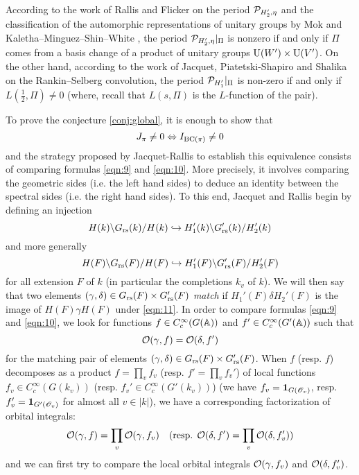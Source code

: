 According to the work of Rallis and Flicker \cite{flicker1988twisted} on the period $\mathcal{P}_{H_2', \eta}$ and the classification of the 
automorphic representations of unitary groups by Mok \cite{mok2015endoscopic} and Kaletha--Minguez--Shin--White \cite{kaletha2014endoscopic}, the period $\mathcal{P}_{H_2', \eta}|_\Pi$ is nonzero if and only if $\Pi$ comes from a basis change of a product of unitary groups $\mathrm{U}(W') \times \mathrm{U}(V')$.
On the other hand, according to the work of
Jacquet, Piatetski-Shapiro and Shalika \cite{jacquet1983rankin} on the Rankin--Selberg convolution, the period $\mathcal{P}_{H_1'}|_\Pi$ is non-zero if and only if $L(\frac{1}{2}, \Pi) \neq 0$ (where, recall that $L(s, \Pi)$ is the $L$-function of the pair).

To prove the conjecture \ref{conj:global}, it is enough to show that
\[
    J_\pi \neq 0 \Leftrightarrow I_{\mathrm{BC}(\pi)} \neq 0
\]
and the strategy proposed by Jacquet-Rallis to establish this equivalence consists of comparing formulas \eqref{eqn:9} and \eqref{eqn:10}.
More precisely, it involves comparing the geometric sides (i.e. the left hand sides) to deduce an identity between the spectral sides (i.e. the right hand sides).
To this end, Jacquet and Rallis begin by defining an injection
\[
    H(k) \backslash G_{\mathrm{rs}}(k) / H(k) \hookrightarrow H_1'(k) \backslash G_{\mathrm{rs}}'(k) / H_2'(k)
\]
and more generally
\begin{equation}
    \label{eqn:11}
    H(F) \backslash G_{\mathrm{rs}}(F) / H(F) \hookrightarrow H_1'(F) \backslash G_{\mathrm{rs}}'(F) / H_2'(F)
\end{equation}
for all extension $F$ of $k$ (in particular the completions $k_v$ of $k$).
We will then say that two elements $(\gamma, \delta) \in G_{\mathrm{rs}}(F) \times G_{\mathrm{rs}}'(F)$ \emph{match} if $H_1'(F) \delta H_2'(F)$ is the image of $H(F) \gamma H(F)$ under \eqref{eqn:11}.
In order to compare formulas \eqref{eqn:9} and \eqref{eqn:10}, we look for functions $f \in C_c^\infty(G(\mathbb{A}))$ and $f' \in C_c^\infty(G'(\mathbb{A}))$ such that
\[
    \mathcal{O}(\gamma, f) = \mathcal{O}(\delta, f')
\]
for the matching pair of elements $(\gamma, \delta) \in G_{\mathrm{rs}}(F) \times G_{\mathrm{rs}}'(F)$.
When $f$ (resp. $f$) decomposes as a product $f = \prod_v f_v$ (resp. $f' = \prod_v f_v'$) of local functions $f_v \in C_c^\infty(G(k_v))$ (resp. $f_v' \in C_c^\infty(G'(k_v))$) (we have $f_v = \mathbf{1}_{G(\mathscr{O}_v)}$, resp. $f_v' = \mathbf{1}_{G'(\mathscr{O}_v)}$ for almost all $v \in |k|$), we have a corresponding factorization of orbital integrals:
\[
    \mathcal{O}(\gamma, f) = \prod_v \mathcal{O}(\gamma, f_v) \quad(\text{resp. } \mathcal{O}(\delta, f') = \prod_v \mathcal{O}(\delta, f_v'))
\]
and we can first try to compare the local orbital integrals $\mathcal{O}(\gamma, f_v)$ and $\mathcal{O}(\delta, f_v')$.
